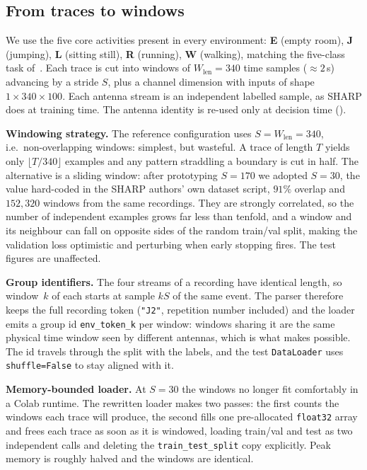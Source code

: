 \subsection{From traces to windows}
We use the five core activities present in every environment: \textbf{E} (empty
room), \textbf{J} (jumping), \textbf{L} (sitting still), \textbf{R} (running),
\textbf{W} (walking), matching the five-class task of~\cite{sharp}. Each trace
is cut into windows of $W_{\text{len}}=340$ time samples ($\approx 2$\,s)
advancing by a stride $S$, plus a channel dimension with inputs of shape
$1\times340\times100$. Each antenna stream is an independent labelled sample, as
SHARP does at training time. The antenna identity is re-used only at decision
time ().

\textbf{Windowing strategy.} The reference configuration uses
$S=W_{\text{len}}=340$, i.e.\ non-overlapping windows: simplest, but
wasteful. A trace of length $T$ yields only $\lfloor T/340\rfloor$ examples and
any pattern straddling a boundary is cut in half. The alternative is a
sliding window: after prototyping $S=170$ we adopted $S=30$, the value hard-coded
in the SHARP authors' own dataset script, $91\%$ overlap and $152{,}320$ windows
from the same recordings. They are strongly correlated, so the number of
independent examples grows far less than tenfold, and a window and its
neighbour can fall on opposite sides of the random train/val split, making the
validation loss optimistic and perturbing when early stopping fires. The
test figures are unaffected.

\textbf{Group identifiers.} The four streams of a recording have identical
length, so window~$k$ of each starts at sample $kS$ of the same event. The parser
therefore keeps the full recording token (\texttt{"J2"}, repetition number
included) and the loader emits a group id \texttt{env\_token\_k} per window:
windows sharing it are the same physical time window seen by different antennas,
which is what makes  possible. The id travels through the
split with the labels, and the test \texttt{DataLoader} uses
\texttt{shuffle=False} to stay aligned with it.

\textbf{Memory-bounded loader.} At $S=30$ the windows no longer fit comfortably 
in a Colab runtime. The rewritten 
loader makes two passes: the first counts the windows
each trace will produce, the second fills one pre-allocated \texttt{float32}
array and frees each trace as soon as it is windowed, loading train/val and
test as two independent calls and deleting the \texttt{train\_test\_split}
copy explicitly. Peak memory is roughly halved and the windows are identical.

